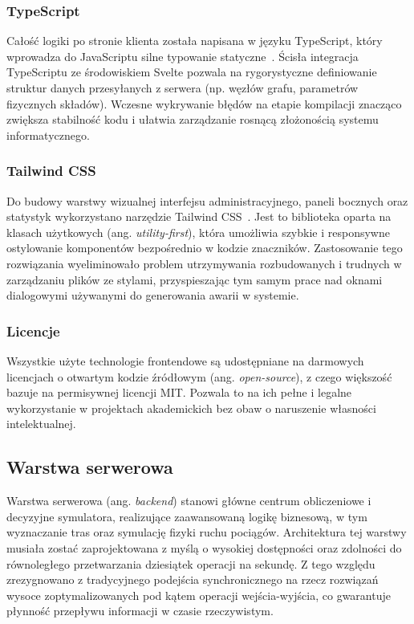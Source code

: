 \documentclass[twoside]{projektInzynierskiMS1z}
\begin{document}
\subsubsection{TypeScript}

Całość logiki po stronie klienta została napisana w języku TypeScript, który wprowadza
do JavaScriptu silne typowanie statyczne~\cite{typescript}. Ścisła integracja
TypeScriptu ze środowiskiem Svelte pozwala na rygorystyczne definiowanie struktur
danych przesyłanych z serwera (np. węzłów grafu, parametrów fizycznych składów).
Wczesne wykrywanie błędów na etapie kompilacji znacząco zwiększa stabilność kodu
i ułatwia zarządzanie rosnącą złożonością systemu informatycznego.

\subsubsection{Tailwind CSS}

Do budowy warstwy wizualnej interfejsu administracyjnego, paneli bocznych oraz
statystyk wykorzystano narzędzie Tailwind CSS~\cite{tailwind}. Jest to biblioteka
oparta na klasach użytkowych (ang. \emph{utility-first}), która umożliwia szybkie
i responsywne ostylowanie komponentów bezpośrednio w kodzie znaczników. Zastosowanie
tego rozwiązania wyeliminowało problem utrzymywania rozbudowanych i trudnych
w zarządzaniu plików ze stylami, przyspieszając tym samym prace nad oknami dialogowymi
używanymi do generowania awarii w systemie.

\subsubsection{Licencje}

Wszystkie użyte technologie frontendowe są udostępniane na darmowych licencjach
o otwartym kodzie źródłowym (ang. \emph{open-source}), z czego większość bazuje na
permisywnej licencji MIT. Pozwala to na ich pełne i legalne wykorzystanie w projektach
akademickich bez obaw o naruszenie własności intelektualnej.

\subsection{Warstwa serwerowa}

Warstwa serwerowa (ang. \emph{backend}) stanowi główne centrum obliczeniowe i decyzyjne
symulatora, realizujące zaawansowaną logikę biznesową, w tym wyznaczanie tras oraz
symulację fizyki ruchu pociągów. Architektura tej warstwy musiała zostać zaprojektowana
z myślą o wysokiej dostępności oraz zdolności do równoległego przetwarzania dziesiątek
operacji na sekundę. Z tego względu zrezygnowano z tradycyjnego podejścia
synchronicznego na rzecz rozwiązań wysoce zoptymalizowanych pod kątem operacji
wejścia-wyjścia, co gwarantuje płynność przepływu informacji w czasie rzeczywistym.
\end{document}
